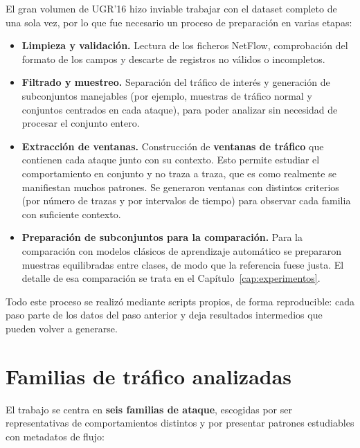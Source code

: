 El gran volumen de UGR'16 hizo inviable trabajar con el dataset completo de una sola vez, por lo que fue necesario un proceso de preparación en varias etapas:

\begin{itemize}
  \item \textbf{Limpieza y validación.} Lectura de los ficheros NetFlow, comprobación del formato de los campos y descarte de registros no válidos o incompletos.
  \item \textbf{Filtrado y muestreo.} Separación del tráfico de interés y generación de subconjuntos manejables (por ejemplo, muestras de tráfico normal y conjuntos centrados en cada ataque), para poder analizar sin necesidad de procesar el conjunto entero.
  \item \textbf{Extracción de ventanas.} Construcción de \textbf{ventanas de tráfico} que contienen cada ataque junto con su contexto. Esto permite estudiar el comportamiento en conjunto y no traza a traza, que es como realmente se manifiestan muchos patrones. Se generaron ventanas con distintos criterios (por número de trazas y por intervalos de tiempo) para observar cada familia con suficiente contexto.
  \item \textbf{Preparación de subconjuntos para la comparación.} Para la comparación con modelos clásicos de aprendizaje automático se prepararon muestras equilibradas entre clases, de modo que la referencia fuese justa. El detalle de esa comparación se trata en el Capítulo~\ref{cap:experimentos}.
\end{itemize}

Todo este proceso se realizó mediante scripts propios, de forma reproducible: cada paso parte de los datos del paso anterior y deja resultados intermedios que pueden volver a generarse.

\section{Familias de tráfico analizadas}
\label{sec:herr_familias}

El trabajo se centra en \textbf{seis familias de ataque}, escogidas por ser representativas de comportamientos distintos y por presentar patrones estudiables con metadatos de flujo:

